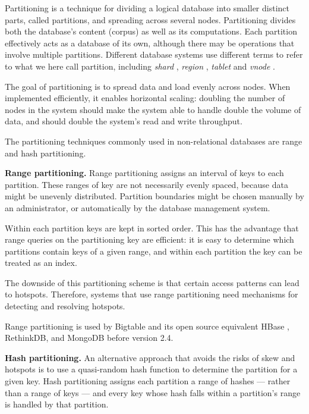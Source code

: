 Partitioning is a technique for dividing a logical database into smaller distinct parts, called partitions, and spreading
across several nodes.
Partitioning divides both the database's content (corpus) as well as its computations.
Each partition effectively acts as a database of its own, although there may be operations that involve multiple partitions.
Different database systems use different terms to refer to what we here call partition, including \textit{shard}
, \textit{region} , \textit{tablet}  and \textit{vnode} .

The goal of partitioning is to spread data and load evenly across nodes.
When implemented efficiently, it enables horizontal scaling:
doubling the number of nodes in the system should make the system able to handle double the volume of data, and
should double the system's read and write throughput.

The partitioning techniques commonly used in non-relational databases are range and hash partitioning.

\bigskip
\noindent
\textbf{Range partitioning.}
Range partitioning assigns an interval of keys to each partition.
These ranges of key are not necessarily evenly spaced, because data might be unevenly distributed.
Partition boundaries might be chosen manually by an administrator, or automatically by the database management system.

Within each partition keys are kept in sorted order.
This has the advantage that range queries on the partitioning key are efficient:
it is easy to determine which partitions contain keys of a given range, and within each partition the key can be treated
as an index.

The downside of this partitioning scheme is that certain access patterns can lead to hotspots.
Therefore, systems that use range partitioning need mechanisms for detecting and resolving hotspots.

Range partitioning is used by Bigtable and its open source equivalent HBase \cite{hbasebigtable:comparison},
RethinkDB, and MongoDB before version 2.4.

\medskip
\noindent
{}

\bigskip
\noindent
\textbf{Hash partitioning.}
An alternative approach that avoids the risks of skew and hotspots is to use a quasi-random hash function to determine the partition
for a given key.
Hash partitioning assigns each partition a range of hashes --- rather than a range of keys --- and every key whose hash
falls within a partition's range is handled by that partition.

